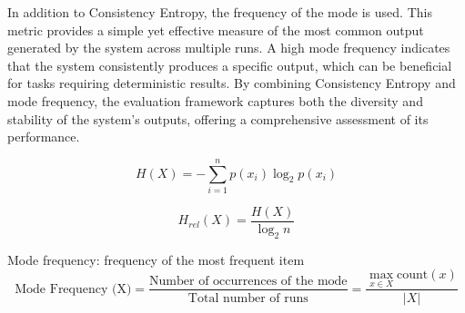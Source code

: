 In addition to Consistency Entropy, the frequency of the mode is used. This metric provides a simple yet effective measure of the most common output generated by the system across multiple runs. A high mode frequency indicates that the system consistently produces a specific output, which can be beneficial for tasks requiring deterministic results. By combining Consistency Entropy and mode frequency, the evaluation framework captures both the diversity and stability of the system's outputs, offering a comprehensive assessment of its performance.

\begin{equation}
    H(X) = - \sum_{i=1}^{n} p(x_i) \log_2 p(x_i)
\end{equation}

\begin{equation}
    H_{rel}(X) = \frac{H(X)}{\log_2 n} 
\end{equation}


Mode frequency: frequency of the most frequent item
\begin{equation}
    \text{Mode Frequency (X)} = \frac{\text{Number of occurrences of the mode}}{\text{Total number of runs}} = \frac{\max_{x \in X} \text{count}(x)}{|X|}
\end{equation}

